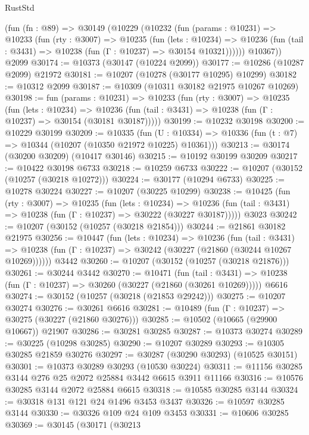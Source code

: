 \begin{lexlean}{RustStd}
\begin{coremodule}
    (fun (fn : @89) =>
    @30149
      (@10229
        (@10232
          (fun (params : @10231) =>
          @10233
            (fun (rty : @3007) =>
            @10235
              (fun (lets : @10234) =>
              @10236 (fun (tail : @3431) => @10238 (fun (Γ : @10237) => @30154 @10321))))))
        @10367))
    @2099
@30174 := @10373 (@30147 (@10224 @2099))
@30177 := @10286 (@10287 @2099) @21972
@30181 := @10207 (@10278 (@30177 @10295) @10299)
@30182 := @10312 @2099
@30187 := @10309 (@10311 @30182 @21975 @10267 @10269)
@30198 := fun (params : @10231) =>
  @10233
    (fun (rty : @3007) =>
    @10235
      (fun (lets : @10234) =>
      @10236 (fun (tail : @3431) => @10238 (fun (Γ : @10237) => @30154 (@30181 @30187)))))
@30199 := @10232 @30198
@30200 := @10229 @30199
@30209 := @10335
    (fun (U : @10334) => @10336 (fun (t : @7) => @10344 (@10207 (@10350 @21972 @10225) @10361)))
@30213 := @30174 (@30200 @30209) (@10417 @30146)
@30215 := @10192 @30199 @30209
@30217 := @10422 @30198 @6733
@30218 := @10259 @6733
@30222 := @10207 (@30152 (@10257 (@30218 @10272)))
@30224 := @30177 (@10294 @6733)
@30225 := @10278 @30224
@30227 := @10207 (@30225 @10299)
@30238 := @10425
    (fun (rty : @3007) =>
    @10235
      (fun (lets : @10234) =>
      @10236 (fun (tail : @3431) => @10238 (fun (Γ : @10237) => @30222 (@30227 @30187)))))
    @3023
@30242 := @10207 (@30152 (@10257 (@30218 @21854)))
@30244 := @21861 @30182 @21975
@30256 := @10447
    (fun (lets : @10234) =>
    @10236
      (fun (tail : @3431) =>
      @10238 (fun (Γ : @10237) => @30242 (@30227 (@21860 (@30244 @10267 @10269))))))
    @3442
@30260 := @10207 (@30152 (@10257 (@30218 @21876)))
@30261 := @30244 @3442
@30270 := @10471
    (fun (tail : @3431) => @10238 (fun (Γ : @10237) => @30260 (@30227 (@21860 (@30261 @10269)))))
    @6616
@30274 := @30152 (@10257 (@30218 (@21853 @29242)))
@30275 := @10207 @30274
@30276 := @30261 @6616
@30281 := @10489 (fun (Γ : @10237) => @30275 (@30227 (@21860 @30276)))
@30285 := @10502 (@10665 (@29900 @10667)) @21907
@30286 := @30281 @30285
@30287 := @10373 @30274
@30289 := @30225 (@10298 @30285)
@30290 := @10207 @30289
@30293 := @10305 @30285 @21859 @30276
@30297 := @30287 (@30290 @30293) (@10525 @30151)
@30301 := @10373 @30289 @30293 (@10530 @30224)
@30311 := @11156 @30285 @3144 @276 @25 @2072 @25884 @3442 @6615 @3911 @11166
@30316 := @10576 @30285 @3144 @2072 @25884 @6615
@30318 := @10585 @30285 @3144
@30324 := @30318 @131 @121 @24 @1496 @3453 @3437
@30326 := @10597 @30285 @3144
@30330 := @30326 @109 @24 @109 @3453
@30331 := @10606 @30285
@30369 := @30145
    (@30171
      (@30213

\end{coremodule}
\end{lexlean}
